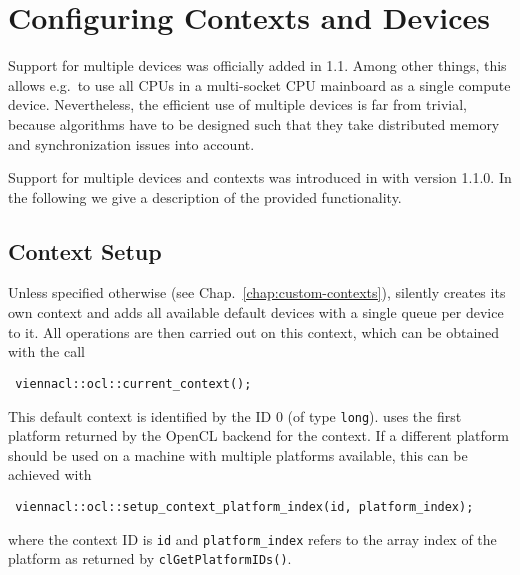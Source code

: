 
\chapter{Configuring Contexts and Devices} \label{chap:multi-devices}
Support for multiple devices was officially added in {\OpenCL} 1.1.
Among other things, this allows e.g.~to use all CPUs in a multi-socket CPU mainboard as a single {\OpenCL} compute device.
Nevertheless, the efficient use of multiple {\OpenCL} devices is far from trivial, because algorithms have to be designed such that 
they take distributed memory and synchronization issues into account.

Support for multiple devices and contexts was introduced in {\ViennaCL} with version 1.1.0. In the following we give a description of the 
provided functionality.

\section{Context Setup}
Unless specified otherwise (see Chap.~\ref{chap:custom-contexts}), {\ViennaCL} silently creates its own context and adds all available default devices with a single queue per device to it.
All operations are then carried out on this context, which can be obtained with the call
\begin{lstlisting}
 viennacl::ocl::current_context();
\end{lstlisting}
This default context is identified by the ID $0$ (of type \lstinline|long|).
{\ViennaCL} uses the first platform returned by the OpenCL backend for the context.
If a different platform should be used on a machine with multiple platforms available,
this can be achieved with
\begin{lstlisting}
 viennacl::ocl::setup_context_platform_index(id, platform_index);
\end{lstlisting}
where the context ID is \lstinline|id| and \lstinline|platform_index| refers to the array index of the platform as returned by \lstinline|clGetPlatformIDs()|.

